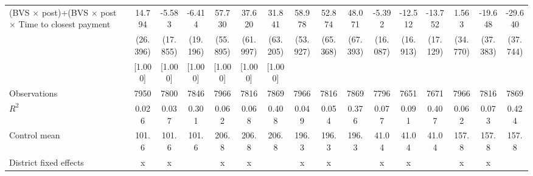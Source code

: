{\begin{tabular}{l*{15}{c}}
\hline (BVS $\times$ post)+(BVS $\times$  post $\times$ Time to closest payment &      14.794         &      -5.583         &      -6.414         &      57.730         &      37.620         &      31.841         &      58.978         &      52.874         &      48.071         &      -5.392         &     -12.512         &     -13.752         &       1.563         &     -19.648         &     -29.640         \\
                    &    (26.396)         &    (17.855)         &    (19.196)         &    (55.895)         &    (61.997)         &    (63.205)         &    (53.927)         &    (65.368)         &    (67.393)         &    (16.087)         &    (16.913)         &    (17.129)         &    (34.770)         &    (37.383)         &    (37.744)         \\
                    &     [1.000]         &     [1.000]         &     [1.000]         &     [1.000]         &     [1.000]         &     [1.000]         &                     &                     &                     &                     &                     &                     &                     &                     &                     \\
\midrule
Observations        &        7950         &        7800         &        7846         &        7966         &        7816         &        7869         &        7966         &        7816         &        7869         &        7796         &        7651         &        7671         &        7966         &        7816         &        7869         \\
\(R^{2}\)           &       0.026         &       0.037         &       0.301         &       0.062         &       0.068         &       0.408         &       0.049         &       0.054         &       0.376         &       0.077         &       0.091         &       0.407         &       0.062         &       0.073         &       0.424         \\
Control mean        &       101.6         &       101.6         &       101.6         &       206.8         &       206.8         &       206.8         &       196.3         &       196.3         &       196.3         &       41.04         &       41.04         &       41.04         &       157.8         &       157.8         &       157.8         \\
District fixed effects&           x         &           x         &                     &           x         &           x         &                     &           x         &           x         &                     &           x         &           x         &                     &           x         &           x         &                     \\

\end{tabular}}
